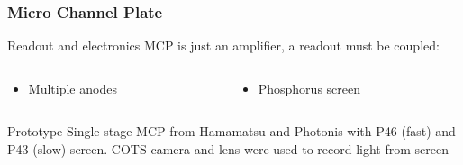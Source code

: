 \begin{frame}[t]
  \frametitle{Micro Channel Plate}
  \begin{block}{Readout and electronics}
    MCP is just an amplifier, a readout must be coupled:
    \begin{columns}[T]
      \begin{column}{0.45\textwidth}
        \begin{itemize}
          \item Multiple anodes
        \end{itemize}
      \end{column}
      \begin{column}{0.45\textwidth}
        \begin{itemize}
          \item Phosphorus screen
        \end{itemize}
      \end{column}
    \end{columns}
  \end{block}
  \begin{block}{Prototype}
    Single stage MCP from Hamamatsu and Photonis with P46 (fast) and P43 (slow) screen. COTS camera and lens were used to record light from screen
  \end{block}


\end{frame}
